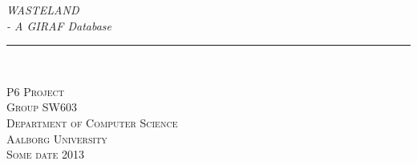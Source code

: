 \thispagestyle{empty}
\begin{flushright}
\vspace{3cm}

\phantom{hul}

\phantom{hul}

\phantom{hul}

\textsl{\Huge WASTELAND}\\ \vspace{0.3cm}
\textsl{\Huge - A GIRAF Database} \vspace{0.5cm}

\rule{13cm}{3mm} \\ \vspace{1.5cm}
\vspace{1cm}


\vspace{1.5cm} 
\textsc{\Large P6 Project \\
Group SW603 \\
Department of Computer Science\\
Aalborg University\\
Some date 2013\\}
\end{flushright}
